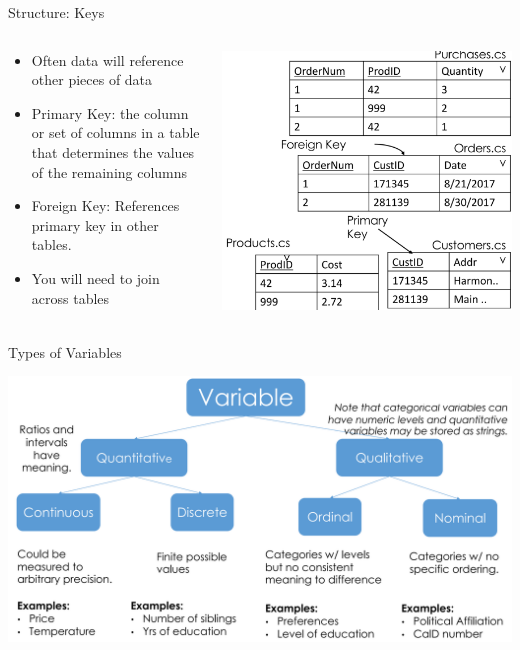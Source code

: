 \documentclass[aspectratio=169]{../latex_main/tntbeamer}  %
\begin{document}
\begin{frame}[c]{Structure: Keys}

\begin{columns}

\begin{column}{0.5\textwidth}

    \begin{itemize}
        \item Often data will reference other pieces of data
        \item Primary Key: the column or set of columns in a
table that determines the values of the remaining columns
        \item Foreign Key: References primary key in other tables.
        \item You will need to join across tables
    \end{itemize}
    
    \end{column}

    \begin{column}{0.5\textwidth}
    
        \includegraphics[width=.8\textwidth]{bild11_db}
            
    \end{column}

\end{columns}

\end{frame}

\begin{frame}[c]{Types of Variables}

    \includegraphics[width=.8\textwidth]{bild11_variable}
    
\end{frame}
\end{document}
